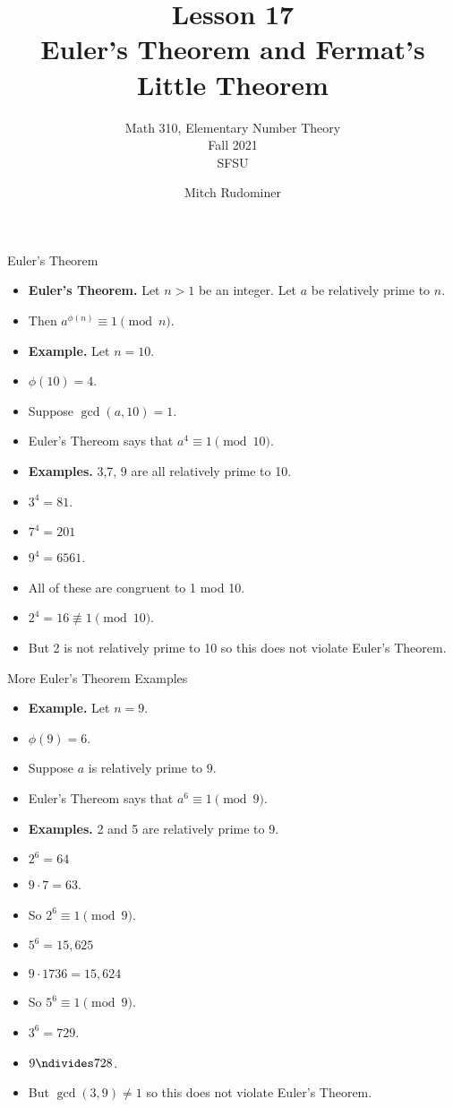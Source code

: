 \documentclass[handout]{beamer}
\title{Lesson 17 \\ Euler's Theorem and Fermat's Little Theorem}
\subtitle{Math 310, Elementary Number Theory \\ Fall 2021 \\ SFSU}
\author{Mitch Rudominer}
\date{}
\begin{document}
\begin{frame}
  \titlepage
\end{frame}

\begin{frame}{Euler's Theorem}

\begin{itemize}
  \item \textbf{Euler's Theorem.} Let $n>1$ be an integer. Let $a$ be relatively prime to $n$.
  \item Then $a^{\phi(n)} \equiv 1 \pmod n$.
  \item \textbf{Example.} Let $n=10$.
  \item $\phi(10)=4$.
  \item Suppose $\gcd(a,10)=1$.
  \item Euler's Thereom says that $a^4 \equiv 1 \pmod{10}$.
  \item \textbf{Examples.} 3,7, 9 are all relatively prime to 10.
  \item $3^4=81$.
  \item $7^4=201$
  \item $9^4 = 6561$.
  \item All of these are congruent to 1 mod 10.
  \item $2^4 = 16 \not\equiv 1 \pmod{10}$.
  \item But 2 is not relatively prime to 10 so this does not violate Euler's Theorem.
\end{itemize}

\end{frame}

\begin{frame}{More Euler's Theorem Examples}

\begin{itemize}
  \item \textbf{Example.} Let $n=9$.
  \item $\phi(9)=6$.
  \item Suppose $a$ is relatively prime to $9$.
  \item Euler's Thereom says that $a^6 \equiv 1 \pmod{9}$.
  \item \textbf{Examples.} 2 and 5 are relatively prime to 9.
  \item $2^6 = 64$
  \item $9\cdot 7 = 63$.
  \item So  $2^6 \equiv 1 \pmod 9$.
  \item $5^6=15,625$
  \item $9\cdot 1736 = 15,624$
  \item So $5^6\equiv 1\pmod 9$.
  \item $3^6 = 729$.
  \item $9\ndivides 728$.
  \item But $\gcd(3,9)\not=1$ so this does not violate Euler's Theorem.
\end{itemize}

\end{frame}
\end{document}
